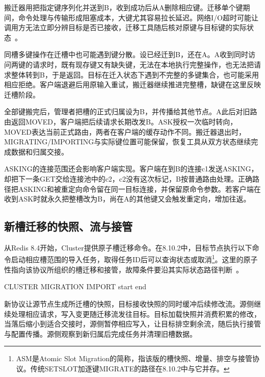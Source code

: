 搬迁器用把指定键序列化并送到B，收到成功后从A删除相应键。迁移单个键期间，命令处理与传输形成阻塞成本，大键尤其容易拉长延迟。网络I/O超时可能让调用方无法立即分辨目标是否已接收，迁移工具随后核对原键与目标键的实际状态~\cite{redis-cluster-spec}。

同槽多键操作在迁槽中也可能遇到键分散。设已经迁到B，还在A。A收到同时访问两键的请求时，既有现存键又有缺失键，无法在本地执行完整操作，也无法把请求整体转到B，于是返回。目标在迁入状态下遇到不完整的多键集合，也可能采用相应拒绝。客户端退避后用原输入重试，搬迁器继续推进完整槽，缺键在这里反映迁槽阶段。

全部键搬完后，管理者把槽的正式归属设为B，并传播给其他节点。A此后对旧路由返回MOVED，客户端把后续请求长期改发B。ASK授权一次临时转向，MOVED表达当前正式路由，两者在客户端的缓存动作不同。搬迁器退出时，MIGRATING/IMPORTING与实际键位置可能保留，恢复工具从双方状态继续完成数据和归属交接。

ASKING的连接范围还会影响客户端实现。客户端在到B的连接c1发送ASKING，却把下一条GET交给连接池中的c2，c2没有这次标记，B按普通路由处理。正确路径把ASKING和被重定向命令留在同一目标连接，并保留原命令参数。若客户端在收到ASK时就永久把整槽改为B，尚在A的其他键又会触发重定向，增加往返。


\subsection{新槽迁移的快照、流与接管}

从Redis 8.4开始，Cluster提供原子槽迁移命令。在8.10.2中，目标节点执行以下命令启动相应槽范围的导入任务，取得任务ID后可以查询状态或取消\footnote{ASM是Atomic Slot Migration的简称，指该版的槽快照、增量、排空与接管协议。传统SETSLOT加逐键MIGRATE的路径在8.10.2中与它并存。}。这里的原子性指向该协议所组织的槽迁移和接管，故障条件要沿其实际状态路径判断~\cite{redis8102-asm}。

\begin{BookCode}
CLUSTER MIGRATION IMPORT start end
\end{BookCode}

新协议让源节点生成所迁槽的快照，目标接收快照的同时缓冲后续修改流。源侧继续处理相应请求，写入变更随迁移流发往目标。目标加载快照并消费积累的修改，当落后缩小到适合交接时，源侧暂停相应写入，让目标排空剩余流，随后执行接管与配置传播。源侧观察到新归属后完成任务并清理旧槽数据。

